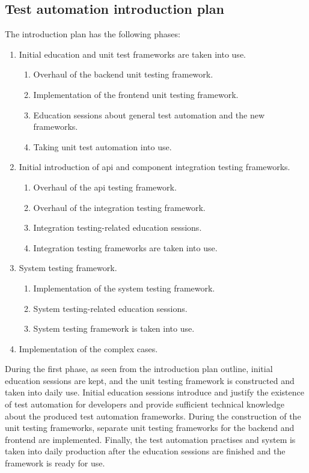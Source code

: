 \subsection{Test automation introduction plan}\label{subsection:test_automation_introduction_plan}
The introduction plan has the following phases:
\begin{enumerate}[noitemsep]
	\item Initial education and unit test frameworks are taken into use.
	\begin{enumerate}[label*=\arabic{enumii}.,noitemsep]
		\item Overhaul of the backend unit testing framework.
		\item Implementation of the frontend unit testing framework.
		\item Education sessions about general test automation and the new frameworks.
		\item Taking unit test automation into use.
	\end{enumerate}
	\item Initial introduction of \gls{api} and component integration testing frameworks.
	\begin{enumerate}[label*=\arabic{enumii}.,noitemsep]
		\item Overhaul of the \gls{api} testing framework.
		\item Overhaul of the integration testing framework.
		\item Integration testing-related education sessions.
		\item Integration testing frameworks are taken into use.
	\end{enumerate}
	\item System testing framework.
	\begin{enumerate}[label*=\arabic{enumii}.,noitemsep]
		\item Implementation of the system testing framework.
		\item System testing-related education sessions.
		\item System testing framework is taken into use.
	\end{enumerate}
	\item Implementation of the complex cases.
\end{enumerate}

During the first phase, as seen from the introduction plan outline, initial education sessions are kept, and the unit testing framework is constructed and taken into daily use. Initial education sessions introduce and justify the existence of test automation for developers and provide sufficient technical knowledge about the produced test automation frameworks. During the construction of the unit testing frameworks, separate unit testing frameworks for the backend and frontend are implemented. Finally, the test automation practises and system is taken into daily production after the education sessions are finished and the framework is ready for use.

